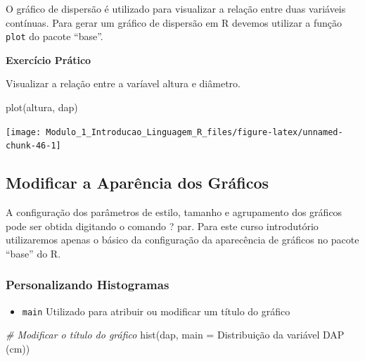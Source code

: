 \documentclass[
]{article}
\newenvironment{Shaded}{\begin{snugshade}}{\end{snugshade}}
\newcommand{\AttributeTok}[1]{\textcolor[rgb]{0.77,0.63,0.00}{#1}}
\newcommand{\CommentTok}[1]{\textcolor[rgb]{0.56,0.35,0.01}{\textit{#1}}}
\newcommand{\FunctionTok}[1]{\textcolor[rgb]{0.00,0.00,0.00}{#1}}
\newcommand{\NormalTok}[1]{#1}
\newcommand{\StringTok}[1]{\textcolor[rgb]{0.31,0.60,0.02}{#1}}
\providecommand{\tightlist}{%
  \setlength{\itemsep}{0pt}\setlength{\parskip}{0pt}}
\begin{document}
O gráfico de dispersão é utilizado para visualizar a relação entre duas
variáveis contínuas. Para gerar um gráfico de dispersão em R devemos
utilizar a função \texttt{plot} do pacote ``base''.

\textbf{Exercício Prático}

Visualizar a relação entre a varíavel altura e diâmetro.

\begin{Shaded}
\begin{Highlighting}[]
\FunctionTok{plot}\NormalTok{(altura, dap)}
\end{Highlighting}
\end{Shaded}

\begin{center}\texttt{[image: Modulo\_1\_Introducao\_Linguagem\_R\_files/figure-latex/unnamed-chunk-46-1]} \end{center}

\hypertarget{modificar-a-aparuxeancia-dos-gruxe1ficos}{%
\subsection{Modificar a Aparência dos
Gráficos}\label{modificar-a-aparuxeancia-dos-gruxe1ficos}}

A configuração dos parâmetros de estilo, tamanho e agrupamento dos
gráficos pode ser obtida digitando o comando ? par. Para este curso
introdutório utilizaremos apenas o básico da configuração da aparecência
de gráficos no pacote ``base'' do R.

\hypertarget{personalizando-histogramas}{%
\subsubsection{Personalizando
Histogramas}\label{personalizando-histogramas}}

\begin{itemize}
\tightlist
\item
  \texttt{main} Utilizado para atribuir ou modificar um título do
  gráfico
\end{itemize}

\begin{Shaded}
\begin{Highlighting}[]
\CommentTok{\# Modificar o título do gráfico}
\FunctionTok{hist}\NormalTok{(dap, }\AttributeTok{main =} \StringTok{\textquotesingle{}Distribuição da variável DAP (cm)\textquotesingle{}}\NormalTok{)}
\end{Highlighting}
\end{Shaded}
\end{document}
